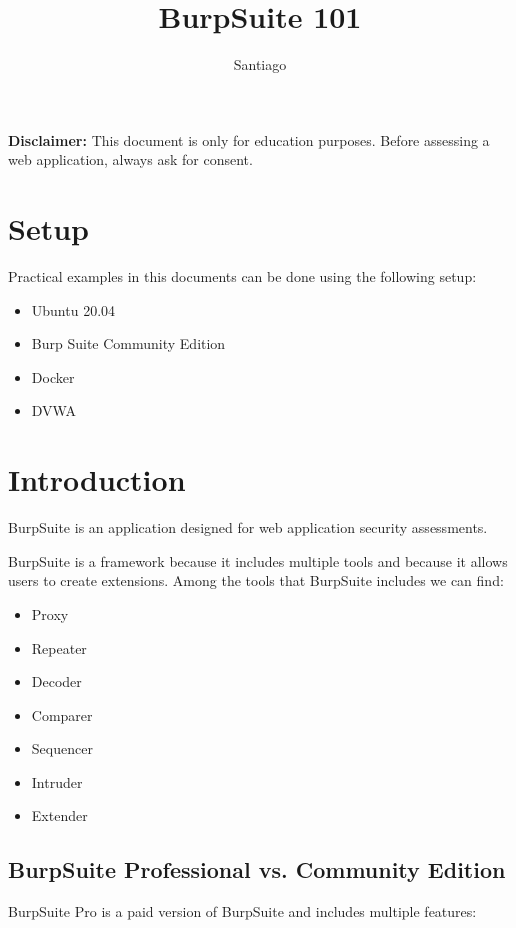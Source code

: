 \documentclass[twocolumn]{article}
\title{BurpSuite 101}
\author{Santiago}
\date{}
\begin{document}
\maketitle

\textbf{Disclaimer:} This document is only for education purposes. Before assessing a web application, always ask for consent.

\section{Setup}

Practical examples in this documents can be done using the following setup:

\begin{itemize}
    \item Ubuntu 20.04
    \item Burp Suite Community Edition\cite{burpsuite}    
    \item Docker\cite{docker}
    \item DVWA\cite{dvwa}
\end{itemize}

\section{Introduction}
BurpSuite is an application designed for web application security assessments.

BurpSuite is a framework because it includes multiple tools and because it allows users to create extensions.
Among the tools that BurpSuite includes we can find:

\begin{itemize}
    \item Proxy
    \item Repeater
    \item Decoder
    \item Comparer
    \item Sequencer
    \item Intruder
    \item Extender
\end{itemize}

\subsection{BurpSuite Professional vs. Community Edition}

BurpSuite Pro is a paid version of BurpSuite and includes multiple features:
\end{document}
